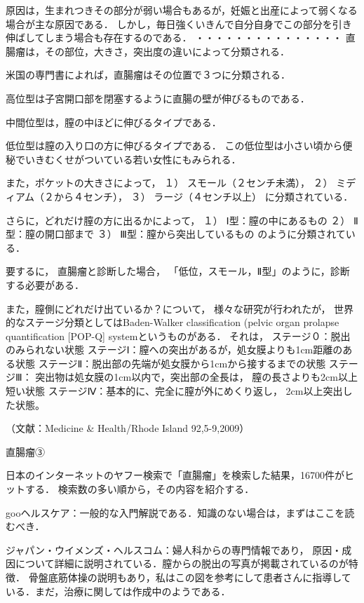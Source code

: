 原因は，生まれつきその部分が弱い場合もあるが，妊娠と出産によって弱くなる場合が主な原因である．
しかし，毎日強くいきんで自分自身でこの部分を引き伸ばしてしまう場合も存在するのである．
・・・・・・・・・・・・・・・
直腸瘤は，その部位，大きさ，突出度の違いによって分類される．

米国の専門書によれば，直腸瘤はその位置で３つに分類される．




高位型は子宮開口部を閉塞するように直腸の壁が伸びるものである．




中間位型は，膣の中ほどに伸びるタイプである．




低位型は膣の入り口の方に伸びるタイプである．
この低位型は小さい頃から便秘でいきむくせがついている若い女性にもみられる．

また，ポケットの大きさによって，
１） スモール（２センチ未満），
２） ミディアム（２から４センチ），
３） ラージ（４センチ以上）
に分類されている．

さらに，どれだけ膣の方に出るかによって，
１） Ⅰ型：膣の中にあるもの
２） Ⅱ型：膣の開口部まで
３） Ⅲ型：膣から突出しているもの
のように分類されている．

要するに，
直腸瘤と診断した場合，
「低位，スモール，Ⅱ型」のように，診断する必要がある．

また，膣側にどれだけ出ているか？について，
様々な研究が行われたが，
世界的なステージ分類としてはBaden-Walker classification (pelvic organ prolapse quantification [POP-Q] systemというものがある．
それは，
ステージ０：脱出のみられない状態
ステージⅠ：膣への突出があるが，処女膜よりも1cm距離のある状態
ステージⅡ：脱出部の先端が処女膜から1cmから接するまでの状態 
ステージⅢ： 突出物は処女膜の1cm以内で，突出部の全長は，
                                           膣の長さよりも2cm以上短い状態
ステージⅣ：基本的に、完全に膣が外にめくり返し，
                                           2cm以上突出した状態。

（文献：Medicine & Health/Rhode Island 92,5-9,2009）

直腸瘤③

日本のインターネットのヤフー検索で「直腸瘤」を検索した結果，16700件がヒットする．
検索数の多い順から，その内容を紹介する．


gooヘルスケア：一般的な入門解説である．知識のない場合は，まずはここを読むべき．

ジャパン・ウイメンズ・ヘルスコム：婦人科からの専門情報であり，
原因・成因について詳細に説明されている．膣からの脱出の写真が掲載されているのが特徴．
骨盤底筋体操の説明もあり，私はこの図を参考にして患者さんに指導している．まだ，治療に関しては作成中のようである．

